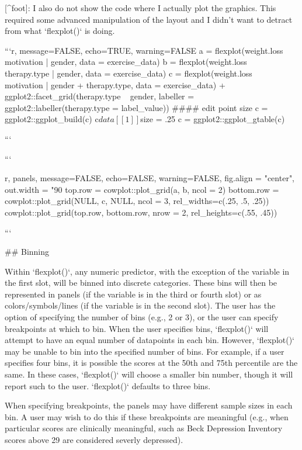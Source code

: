 {{{{{{{{{[^foot]: I also do not show the code where I actually plot the graphics. This required some advanced manipulation of the layout and I didn't want to detract from what `flexplot()` is doing. 

```{r, message=FALSE, echo=TRUE, warning=FALSE}
a = flexplot(weight.loss ~ motivation | gender, 
             data = exercise_data)
b = flexplot(weight.loss ~ therapy.type | gender, 
             data = exercise_data)
c = flexplot(weight.loss ~ motivation |  gender + therapy.type, 
             data = exercise_data) +
      ggplot2::facet_grid(therapy.type ~ gender, 
              labeller = ggplot2::labeller(therapy.type = label_value)) 
#### edit point size
c = ggplot2::ggplot_build(c)
c$data[[1]]$size = .25
c = ggplot2::ggplot_gtable(c)

```


```{r, panels, message=FALSE, echo=FALSE, warning=FALSE, fig.align = "center", out.width = "90%
		top.row = cowplot::plot_grid(a, b, ncol = 2)
		bottom.row = cowplot::plot_grid(NULL, c, NULL, ncol = 3, rel_widths=c(.25, .5, .25))
		cowplot::plot_grid(top.row, bottom.row, nrow = 2, rel_heights=c(.55, .45))
  
```



## Binning

Within `flexplot()`, any numeric predictor, with the exception of the variable in the first slot, will be binned into discrete categories. These bins will then be represented in panels (if the variable is in the third or fourth slot) or as colors/symbols/lines (if the variable is in the second slot). The user has the option of specifying the number of bins (e.g., 2 or 3), or the user can specify breakpoints at which to bin. When the user specifies bins, `flexplot()` will attempt to have an equal number of datapoints in each bin. However, `flexplot()` may be unable to bin into the specified number of bins. For example, if a user specifies four bins, it is possible the scores at the 50th and 75th percentile are the same. In these cases, `flexplot()` will choose a smaller bin number, though it will report such to the user. `flexplot()` defaults to three bins. 

When specifying breakpoints, the panels may have different sample sizes in each bin. A user may wish to do this if these breakpoints are meaningful (e.g., when particular scores are clinically meaningful, such as Beck Depression Inventory scores above 29 are considered severly depressed). 

}}}}}}}}}}

